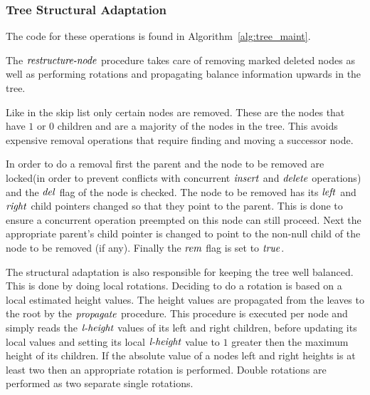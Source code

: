 

\subsubsection{Tree Structural Adaptation} \label{sec:treemaint}
The code for these operations is found in Algorithm~\ref{alg:tree_maint}.

The $\ms{restructure-node}$ procedure takes care of removing marked deleted nodes as well as
performing rotations and propagating balance information upwards in the tree.

Like in the skip list only certain nodes are removed.
These are the nodes that have $1$ or $0$ children and are a majority of the nodes in the tree.
This avoids expensive removal operations that require finding
and moving a successor node.

In order to do a removal first the parent and the node to be removed are locked(in order to
prevent conflicts with concurrent $\ms{insert}$ and $\ms{delete}$ operations) and the
$\ms{del}$ flag of the node is checked.
The node to be removed has its $\ms{left}$ and $\ms{right}$ child pointers changed so that they point to the parent.
This is done to ensure a concurrent operation preempted on this node can still proceed.
Next the appropriate parent's child pointer is changed to point to the non-null child of the node to be removed
(if any).
Finally the $\ms{rem}$ flag is set to $\ms{true}$.

% 


The structural adaptation is also responsible for keeping the tree well balanced.
This is done by doing local rotations.
Deciding to do a rotation is based on a local estimated height values.
The height values are propagated from the leaves to the root by the $\ms{propagate}$ procedure.
This procedure is executed per node and simply reads the $\ms{l-height}$ values of its left
and right children, before updating its local values and setting its local $\ms{l-height}$ value
to $1$ greater then the maximum height of its children.
If the absolute value of a nodes left and right heights is at least two
then an appropriate rotation is performed.
Double rotations are performed as two separate single rotations.

